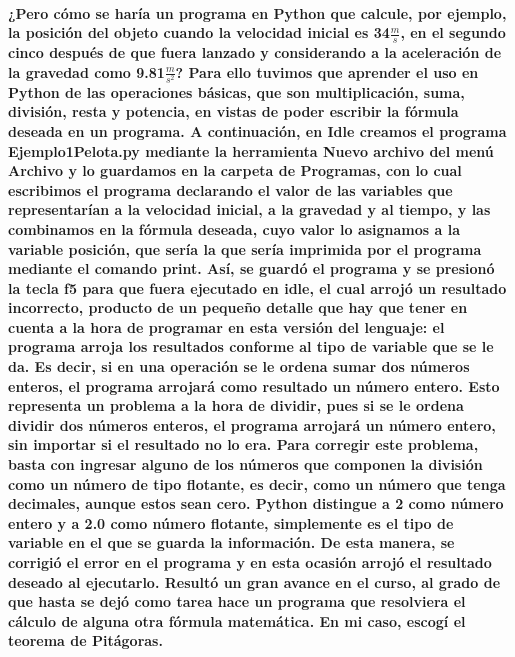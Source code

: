 \documentclass[letterpaper, 12pt, oneside]{article} %
\begin{document}
	\paragraph{¿Pero cómo se haría un programa en Python que calcule, por ejemplo, la posición del objeto cuando la velocidad inicial es 34$\frac{m}{s}$, en el segundo cinco después de que fuera lanzado y considerando a la aceleración de la gravedad como 9.81$\frac{m}{s^2}$? Para ello tuvimos que aprender el uso en Python de las operaciones básicas, que son multiplicación, suma, división, resta y potencia, en vistas de poder escribir la fórmula deseada en un programa. A continuación, en Idle creamos el programa Ejemplo1Pelota.py mediante la herramienta Nuevo archivo del menú Archivo y lo guardamos en la carpeta de Programas, con lo cual escribimos el programa declarando el valor de las variables que representarían a la velocidad inicial, a la gravedad y al tiempo, y las combinamos en la fórmula deseada, cuyo valor lo asignamos a la variable posición, que sería la que sería imprimida por el programa mediante el comando print. Así, se guardó el programa y se presionó la tecla f5 para que fuera ejecutado en idle, el cual arrojó un resultado incorrecto, producto de un pequeño detalle que hay que tener en cuenta a la hora de programar en esta versión del lenguaje: el programa arroja los resultados conforme al tipo de variable que se le da. Es decir, si en una operación se le ordena sumar dos números enteros, el programa arrojará como resultado un número entero. Esto representa un problema a la hora de dividir, pues si se le ordena dividir dos números enteros, el programa arrojará un número entero, sin importar si el resultado no lo era. Para corregir este problema, basta con ingresar alguno de los números que componen la división como un número de tipo flotante, es decir, como un número que tenga decimales, aunque estos sean cero. Python distingue a 2 como número entero y a 2.0 como número flotante, simplemente es el tipo de variable en el que se guarda la información. De esta manera, se corrigió el error en el programa y en esta ocasión arrojó el resultado deseado al ejecutarlo. Resultó un gran avance en el curso, al grado de que hasta se dejó como tarea hace un programa que resolviera el cálculo de alguna otra fórmula matemática. En mi caso, escogí el teorema de Pitágoras.}
\end{document}
